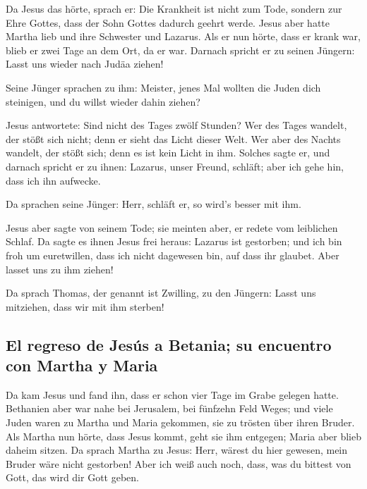  Da Jesus das hörte, sprach er: Die Krankheit ist nicht
zum Tode, sondern zur Ehre Gottes, dass der Sohn Gottes dadurch geehrt
werde.  Jesus aber hatte Martha lieb und ihre Schwester
und Lazarus.  Als er nun hörte, dass er krank war, blieb
er zwei Tage an dem Ort, da er war.  Darnach spricht er zu
seinen Jüngern: Lasst uns wieder nach Judäa ziehen!

 Seine Jünger sprachen zu ihm: Meister, jenes Mal wollten
die Juden dich steinigen, und du willst wieder dahin ziehen?

 Jesus antwortete: Sind nicht des Tages zwölf Stunden? Wer
des Tages wandelt, der stößt sich nicht; denn er sieht das Licht dieser
Welt.  Wer aber des Nachts wandelt, der stößt sich; denn
es ist kein Licht in ihm.  Solches sagte er, und darnach
spricht er zu ihnen: Lazarus, unser Freund, schläft; aber ich gehe hin,
dass ich ihn aufwecke.

 Da sprachen seine Jünger: Herr, schläft er, so wird's
besser mit ihm.

 Jesus aber sagte von seinem Tode; sie meinten aber, er
redete vom leiblichen Schlaf.  Da sagte es ihnen Jesus
frei heraus: Lazarus ist gestorben;  und ich bin froh um
euretwillen, dass ich nicht dagewesen bin, auf dass ihr glaubet. Aber
lasset uns zu ihm ziehen!

 Da sprach Thomas, der genannt ist Zwilling, zu den
Jüngern: Lasst uns mitziehen, dass wir mit ihm sterben!

\hypertarget{el-regreso-de-jesuxfas-a-betania-su-encuentro-con-martha-y-maria}{%
\subsection{El regreso de Jesús a Betania; su encuentro con Martha y
Maria}\label{el-regreso-de-jesuxfas-a-betania-su-encuentro-con-martha-y-maria}}

 Da kam Jesus und fand ihn, dass er schon vier Tage im
Grabe gelegen hatte.  Bethanien aber war nahe bei
Jerusalem, bei fünfzehn Feld Weges;  und viele Juden
waren zu Martha und Maria gekommen, sie zu trösten über ihren Bruder.
 Als Martha nun hörte, dass Jesus kommt, geht sie ihm
entgegen; Maria aber blieb daheim sitzen.  Da sprach
Martha zu Jesus: Herr, wärest du hier gewesen, mein Bruder wäre nicht
gestorben!  Aber ich weiß auch noch, dass, was du bittest
von Gott, das wird dir Gott geben.

